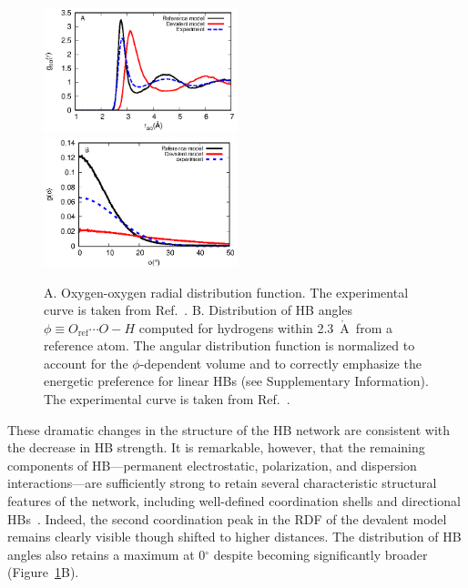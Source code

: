 \documentclass[journal=jacsat,manuscript=article]{achemso}
\newcommand{\Ang}{\ensuremath{\mathring{\text{A}}}}
\begin{document}
\begin{figure}
\includegraphics[width=0.5\textwidth]{new_rdf}
\includegraphics[width=0.5\textwidth]{new_adf}
\caption{A. Oxygen-oxygen radial distribution function. The experimental curve is taken from Ref.~. B. Distribution of HB angles $\phi \equiv O_{\text{ref}} \cdots O-H$ computed for hydrogens within 2.3~\Ang\ from a reference atom. The angular distribution function is normalized to account for the $\phi$-dependent volume and to correctly emphasize the energetic preference for linear HBs (see Supplementary Information). The experimental curve is taken from Ref.~.} \label{Fig:RDF}
\end{figure}

These dramatic changes in the structure of the HB network are consistent with the decrease in HB strength. 
It is remarkable, however, that the remaining components of HB---permanent electrostatic, polarization, and dispersion interactions---are sufficiently strong to retain several characteristic structural features of the network, including well-defined coordination shells and directional HBs~\cite{arunan2011definition}. 
Indeed, the second coordination peak in the RDF of the devalent model remains clearly visible though shifted to higher distances. 
The distribution of HB angles also retains a maximum at 0$^\circ$ despite becoming significantly broader (Figure~\ref{Fig:RDF}B).
\end{document}

